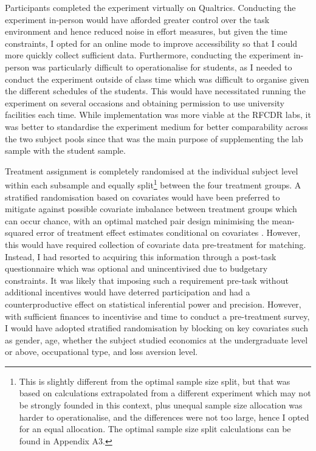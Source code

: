 \documentclass[12pt, letterpaper, DIV=11, numbers=noendperiod]{article}
\begin{document}
Participants completed the experiment virtually on Qualtrics. Conducting the experiment in-person would have afforded greater control over the task environment and hence reduced noise in effort measures, but given the time constraints, I opted for an online mode to improve accessibility so that I could more quickly collect sufficient data. Furthermore, conducting the experiment in-person was particularly difficult to operationalise for students, as I needed to conduct the experiment outside of class time which was difficult to organise given the different schedules of the students. This would have necessitated running the experiment on several occasions and obtaining permission to use university facilities each time. While implementation was more viable at the RFCDR labs, it was better to standardise the experiment medium for better comparability across the two subject pools since that was the main purpose of supplementing the lab sample with the student sample.

Treatment assignment is completely randomised at the individual subject level within each subsample and equally split\footnote{This is slightly different from the optimal sample size split, but that was based on calculations extrapolated from a different experiment which may not be strongly founded in this context, plus unequal sample size allocation was harder to operationalise, and the differences were not too large, hence I opted for an equal allocation. The optimal sample size split calculations can be found in Appendix A3.} between the four treatment groups. A stratified randomisation based on covariates would have been preferred to mitigate against possible covariate imbalance between treatment groups which can occur chance, with an optimal matched pair design minimising the mean-squared error of treatment effect estimates conditional on covariates \parencite{bai.2022.optimalitymatchedpair}. However, this would have required collection of covariate data pre-treatment for matching. Instead, I had resorted to acquiring this information through a post-task questionnaire which was optional and unincentivised due to budgetary constraints. It was likely that imposing such a requirement pre-task without additional incentives would have deterred participation and had a counterproductive effect on statistical inferential power and precision. However, with sufficient finances to incentivise and time to conduct a pre-treatment survey, I would have adopted stratified randomisation by blocking on key covariates such as gender, age, whether the subject studied economics at the undergraduate level or above, occupational type, and loss aversion level.
\end{document}
